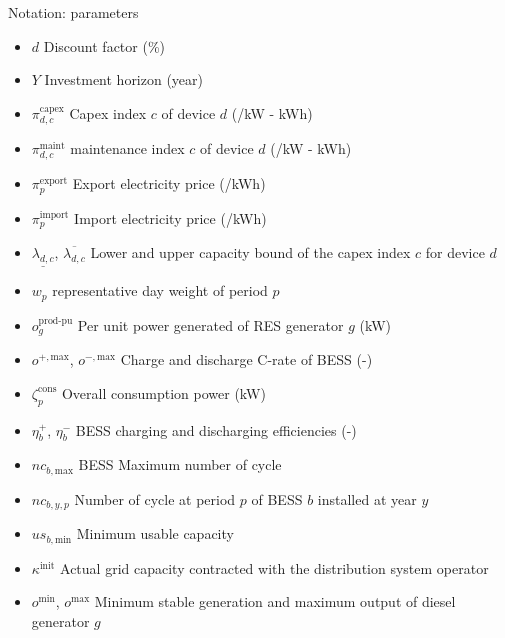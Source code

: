 \begin{frame}[allowframebreaks]{Notation: parameters}
\begin{itemize}
    \item $d$ Discount factor (\%)
    \item $Y$ Investment horizon (year)
    \item $\pi_{d, c}^{\text{capex}}$ Capex index $c$  of device $d$ (\texteuro/kW - kWh)
    \item $\pi_{d, c}^{\text{maint}}$ maintenance index $c$  of device $d$ (\texteuro/kW - kWh)
    \item $\pi_p^{\text{export}}$ Export electricity price (\texteuro/kWh)
    \item $\pi_p^{\text{import}}$ Import electricity price (\texteuro/kWh)
    \item $\underline{\lambda_{d,c}}$, $\overline{\lambda_{d,c}}$ Lower and upper capacity bound of the capex index $c$ for device $d$
    \item $w_p$ representative day weight of period $p$
    \item $o^{\text{prod-pu}}_g$ Per unit power generated of RES generator $g$ (kW)
    \item $o^{+, \text{max}}$, $o^{-,\text{max}}$ Charge and discharge C-rate of BESS (-)
\end{itemize}
\begin{itemize}
    \item $\zeta^\text{cons}_p$ Overall consumption power (kW)
    \item $\eta_b^+$, $\eta_b^-$ BESS charging and discharging efficiencies (-)
    \item $nc_{b,\text{max}}$ BESS Maximum number of cycle 
    \item $nc_{b,y, p}$ Number of cycle at period $p$ of BESS $b$ installed at year $y$
    \item $us_{b,\text{min}}$ Minimum usable capacity
    \item $\kappa^{\text{init}}$ Actual grid capacity contracted with the distribution system operator
    \item $o^{\text{min}}$, $o^{\text{max}}$ Minimum stable generation and maximum output of diesel generator $g$
\end{itemize}
\end{frame}
